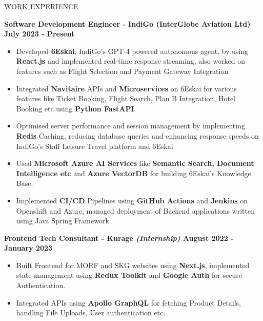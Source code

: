 \documentclass{resume} %
\begin{document}





\begin{rSection}{WORK EXPERIENCE}

{\bf Software Development Engineer - IndiGo (InterGlobe Aviation Ltd)  \hfill July 2023 - Present }
\begin{itemize}
    \item {\normalfont Developed \textbf{6Eskai}, IndiGo's GPT-4 powered autonomous agent, by using \textbf{React.js} and implemented real-time response streaming, also worked on features such as Flight Selection and Payment Gateway Integration}
    \item{\normalfont Integrated \textbf{Navitaire} APIs and \textbf{Microservices} on 6Eskai for various features like Ticket Booking, Flight Search, Plan B Integration, Hotel Booking etc using \textbf{Python FastAPI}.}
    \item {\normalfont Optimised server performance and session management by implementing \textbf{Redis }Caching, reducing database queries and enhancing response speeds on IndiGo’s Staff Leisure Travel platform and 6Eskai.}
    \item {\normalfont Used \textbf{Microsoft Azure AI Services} like \textbf{Semantic Search, Document Intelligence etc} and \textbf{Azure VectorDB} for building 6Eskai's Knowledge Base.}
    \item {\normalfont Implemented \textbf{CI/CD} Pipelines using \textbf{GitHub Actions} and \textbf{Jenkins} on Openshift and Azure, managed deployment of Backend applications written using Java Spring Framework}
\end{itemize}


{\bf Frontend Tech Consultant - Kurage {\normalfont \emph{(Internship)}}  \hfill August 2022 - January 2023 }
\begin{itemize}

    \item {\normalfont Built Frontend for MORF and SKG websites using \textbf{Next.js}, implemented state management using 
 \textbf{Redux Toolkit} and \textbf{Google Auth} for secure Authentication.}
   \item {\normalfont Integrated APIs using \textbf{{Apollo GraphQL}} for fetching Product Details, handling File Uploads, User authentication etc.} 
\end{itemize}

\end{rSection}
\end{document}
